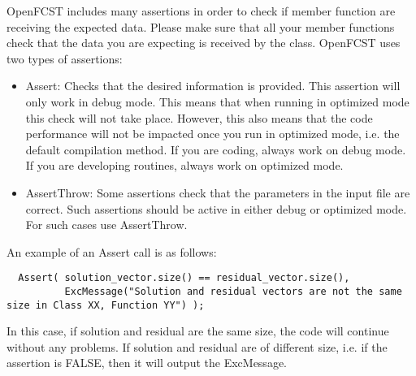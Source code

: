 OpenFCST includes many assertions in order to check if member function are receiving the expected data. Please make sure that all your member functions check that the data you are expecting is received by the class. OpenFCST uses two types of assertions:
\begin{itemize}
 \item Assert: Checks that the desired information is provided. This assertion will only work in debug mode. This means that when running in optimized mode this check will not take place. However, this also means that the code performance will not be impacted once you run in optimized mode, i.e. the default compilation method. If you are coding, always work on debug mode. If you are developing routines, always work on optimized mode.
 \item AssertThrow: Some assertions check that the parameters in the input file are correct. Such assertions should be active in either debug or optimized mode. For such cases use AssertThrow.
\end{itemize}

An example of an Assert call is as follows:
\begin{lstlisting}
  Assert( solution_vector.size() == residual_vector.size(), 
          ExcMessage("Solution and residual vectors are not the same size in Class XX, Function YY") );
\end{lstlisting}
In this case, if solution and residual are the same size, the code will continue without any problems. If solution and residual are of different size, i.e. if the assertion is FALSE, then it will output the ExcMessage.
